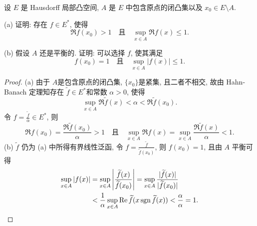 \begin{exercise}
    设 $E$ 是 Hausdorff 局部凸空间, $A$ 是 $E$ 中包含原点的闭凸集以及 $x_0\in E\setminus A$.

    (a) 证明: 存在 $f\in E^*$, 使得
    \[\Re f(x_0)>1\quad\text{且}\quad\sup_{x\in A}\Re f(x)\leq 1.\]

    (b) 假设 $A$ 还是平衡的. 证明: 可以选择 $f$, 使其满足
    \[f(x_0)=1\quad\text{且}\quad\sup_{x\in A}|f(x)|\leq 1.\]
\end{exercise}

\begin{proof}
    (a) 由于 $A$是包含原点的闭凸集, $\{x_0\}$是紧集, 且二者不相交,
    故由 Hahn-Banach 定理知存在 $\widetilde{f}\in E^*$和常数 $\alpha>0$, 使得
    \[\sup_{x\in A}\Re\widetilde{f}(x)<\alpha<\Re\widetilde{f}(x_0).\]
    令 $f=\frac{\widetilde{f}}{\alpha}\in E^*$, 则
    \[\Re f(x_0)=\frac{\Re\widetilde{f}(x_0)}{\alpha}>1\quad\text{且}\quad\sup_{x\in A}\Re f(x)=\sup_{x\in A}\frac{\Re\widetilde{f}(x)}{\alpha}<1.\]
    (b) $\widetilde{f}$ 仍为 (a) 中所得有界线性泛函, 令 $f=\frac{\widetilde{f}}{\widetilde{f}(x_0)}$, 则
    $f(x_0)=1$, 且由 $A$ 平衡可得
    \begin{align*}
        \sup_{x\in A}|f(x)|
        & =\sup_{x\in A}\left|\frac{\widetilde{f}(x)}{\widetilde{f}(x_0)}\right|=\sup_{x\in A}\frac{|\widetilde{f}(x)|}{|\widetilde{f}(x_0)|} \\
        & <\frac{1}{\alpha}\sup_{x\in A}\operatorname{Re}\widetilde{f}(x\operatorname{sgn}\widetilde{f}(x))<\frac{\alpha}{\alpha}=1.\qedhere
    \end{align*}
\end{proof}
